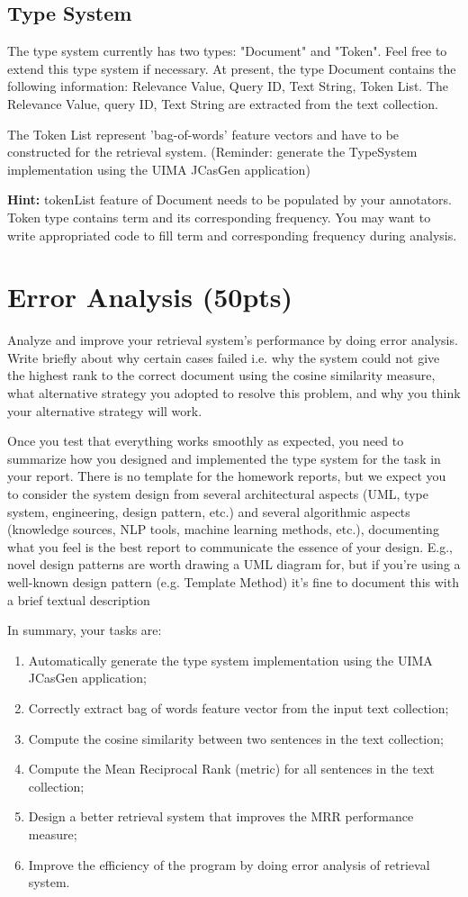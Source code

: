 \documentclass[oneside,11pt]{book}
\begin{document}
\section{Type System}\label{SectionType}
The type system currently has two types: "Document" and "Token". 
Feel free to extend this type system if necessary.
At present, the
type Document contains the following information: Relevance Value, Query ID, Text String, Token
List. The Relevance Value, query ID, Text String are extracted from the text collection. 

The Token List
represent 'bag-of-words' feature vectors and have to be constructed for the retrieval system. (Reminder:
generate the TypeSystem implementation using the UIMA JCasGen application)

\textbf{Hint:} tokenList feature of Document needs to be populated by your annotators. 
Token type contains term and its corresponding frequency. 
You may want to write appropriated code to fill term
and corresponding frequency during analysis. 

\chapter{Error Analysis (50pts)}
Analyze and improve your retrieval system's performance by doing error analysis. Write briefly about
why certain cases failed i.e. why the system could not give the highest rank to the correct document
using the cosine similarity measure, what alternative strategy you adopted to resolve this problem, and
why you think your alternative strategy will work.

Once you test that everything works smoothly as expected, you need to summarize how you designed 
and implemented the type system for the task in your report. There is no template for the homework
reports, but we expect you to consider the system design from several architectural aspects (UML, type
system, engineering, design pattern, etc.) and several algorithmic aspects (knowledge sources, NLP
tools, machine learning methods, etc.), documenting what you feel is the best report to communicate
the essence of your design. E.g., novel design patterns are worth drawing a UML diagram for, but if
you’re using a well-known design pattern (e.g. Template Method) it’s fine to document this with a brief
textual description


In summary, your tasks are:
\begin{enumerate}
\item Automatically generate the type system implementation using the UIMA JCasGen application;
\item Correctly extract bag of words feature vector from the input text collection;
\item Compute the cosine similarity between two sentences in the text collection;
\item Compute the Mean Reciprocal Rank (metric) for all sentences in the text collection;
\item Design a better retrieval system that improves the MRR performance measure;
\item Improve the efficiency of the program by doing error analysis of retrieval system.
\end{enumerate}
\end{document}

